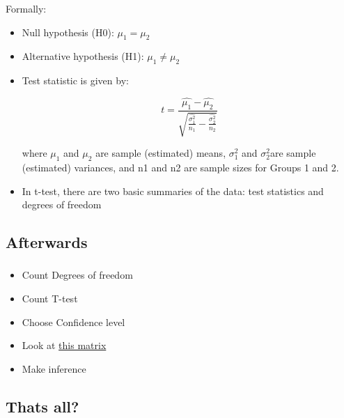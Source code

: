 \documentclass[t, 11pt]{beamer}
\begin{document}
    \begin{frame}
	\frametitle{\insertsection} 
	\framesubtitle{\insertsubsection} 
	
	
	Formally:
	
	\begin{itemize}
	
    
    \item Null hypothesis (H0): $\mu_1 =\mu_2  $
	
	\item Alternative hypothesis (H1): $\mu_1 \neq \mu_2 $
	
	\item Test statistic is given by:
	
	$$t = \frac{\hat{\mu_1} -\hat{\mu_2} }{\sqrt{ \frac{\hat{\sigma_1^2}}{n_1}  -  \frac{\hat{\sigma_2^2}}{n_2 }}}$$
	
	
	where $\mu_1$ and $\mu_2$ are sample (estimated) means, $\sigma_1^2$ and $\sigma_2^2$are sample (estimated) variances, and n1 and n2 are sample sizes for Groups 1 and 2.
	 
  \item In t-test, there are two basic summaries of the data: test statistics and degrees of freedom
	\end{itemize}
\end{frame}	

\subsection{Afterwards}
	
	\begin{frame}
		
		\frametitle{\insertsection} 
		\framesubtitle{\insertsubsection} 
		
		\begin{itemize}
			\item Count Degrees of freedom
			\item Count T-test
			\item Choose Confidence level
			\item Look at \href{https://www.sjsu.edu/faculty/gerstman/StatPrimer/t-table.pdf}{this matrix}
			\item Make inference
		\end{itemize}
		
		
		\end{frame}	
	    

	\subsection{Thats all?}
	
\end{document}
